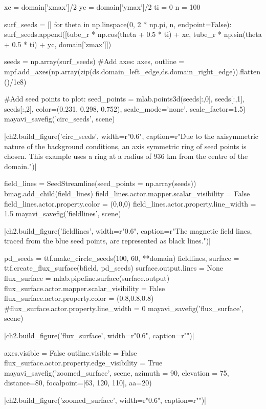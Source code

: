 \begin{pycode}[chapter2]
xc = domain['xmax']/2
yc = domain['ymax']/2
ti = 0
n = 100

surf_seeds = []
for theta in np.linspace(0, 2 * np.pi, n, endpoint=False):
    surf_seeds.append([tube_r * np.cos(theta + 0.5 * ti) + xc,
                  tube_r * np.sin(theta + 0.5 * ti) + yc, domain['zmax']])
                  
seeds = np.array(surf_seeds)
#Add axes:
axes, outline = mpf.add_axes(np.array(zip(ds.domain_left_edge,ds.domain_right_edge)).flatten()/1e8)

#Add seed points to plot:
seed_points = mlab.points3d(seeds[:,0], seeds[:,1], seeds[:,2],
                            color=(0.231, 0.298, 0.752), scale_mode='none',
                            scale_factor=1.5)
mayavi_savefig('circ_seeds', scene)
\end{pycode}
\py[chapter2]|ch2.build_figure('circ_seeds', width=r"0.6\columnwidth",
caption=r"Due to the axisymmetric nature of the background conditions, an axis symmetric ring of seed points is chosen. This example uses a ring at a radius of $936$ km from the centre of the domain.")|

\begin{pycode}[chapter2]
field_lines = SeedStreamline(seed_points = np.array(seeds))
bmag.add_child(field_lines)
field_lines.actor.mapper.scalar_visibility = False
field_lines.actor.property.color = (0,0,0)
field_lines.actor.property.line_width = 1.5
mayavi_savefig('fieldlines', scene)
\end{pycode}
\py[chapter2]|ch2.build_figure('fieldlines', width=r"0.6\columnwidth",
caption=r"The magnetic field lines, traced from the blue seed points, are represented as black lines.")|

\begin{pycode}[chapter2]
pd_seeds = ttf.make_circle_seeds(100, 60, **domain)
fieldlines, surface = ttf.create_flux_surface(bfield, pd_seeds)
surface.output.lines = None
flux_surface = mlab.pipeline.surface(surface.output)
flux_surface.actor.mapper.scalar_visibility = False
flux_surface.actor.property.color = (0.8,0.8,0.8)
#flux_surface.actor.property.line_width = 0
mayavi_savefig('flux_surface', scene)
\end{pycode}
\py[chapter2]|ch2.build_figure('flux_surface', width=r"0.6\columnwidth",
caption=r"")|

\begin{pycode}[chapter2]
axes.visible = False
outline.visible = False
flux_surface.actor.property.edge_visibility = True
mayavi_savefig('zoomed_surface', scene, azimuth = 90, elevation = 75, distance=80, focalpoint=[63, 120, 110], aa=20)
\end{pycode}
\py[chapter2]|ch2.build_figure('zoomed_surface', width=r"0.6\columnwidth",
caption=r"")|


